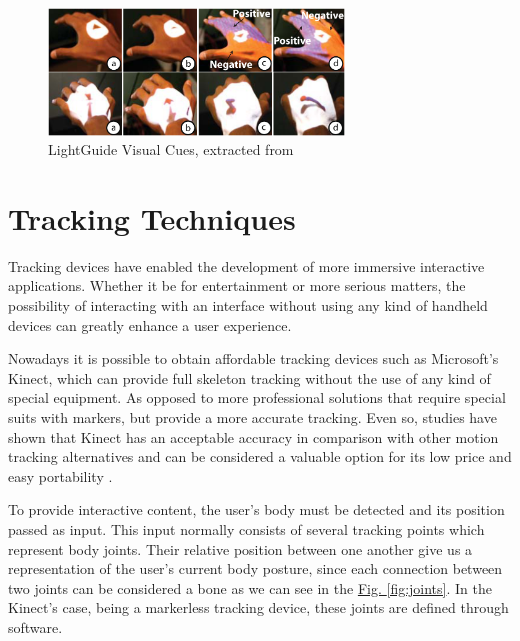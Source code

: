 \begin{figure}
\centering
\includegraphics[width=0.7\textwidth]{imgs/lightguide.png}
\caption{LightGuide Visual Cues, extracted from \cite{Sodhi2012}}
\label{fig:lightguide}
\end{figure}

\section{Tracking Techniques} 

Tracking devices have enabled the development of more immersive interactive applications.
Whether it be for entertainment or more serious matters, the possibility of interacting with 
an interface without using any kind of handheld devices can greatly enhance a user experience.

Nowadays it is possible to obtain affordable tracking devices such as Microsoft's Kinect, which 
can provide full skeleton tracking without the use of any kind of special equipment.
As opposed to more professional solutions that require special suits with markers, but provide a more accurate tracking. 
Even so, studies have shown that Kinect has an acceptable accuracy in comparison with other motion tracking alternatives 
and can be considered a valuable option for its low price and easy portability \cite{Scano2014,Chang2012a}.

To provide interactive content, the user's body must be detected and its position passed as input. This input normally consists of several tracking points which represent body joints. Their relative position between one another give us a representation of the user's current body posture, since each connection between two joints can be considered a bone as we can see in the 
\hyperref[fig:joints]{Fig. \ref{fig:joints}}.
In the Kinect's case, being a markerless tracking device, these joints are defined through software.


